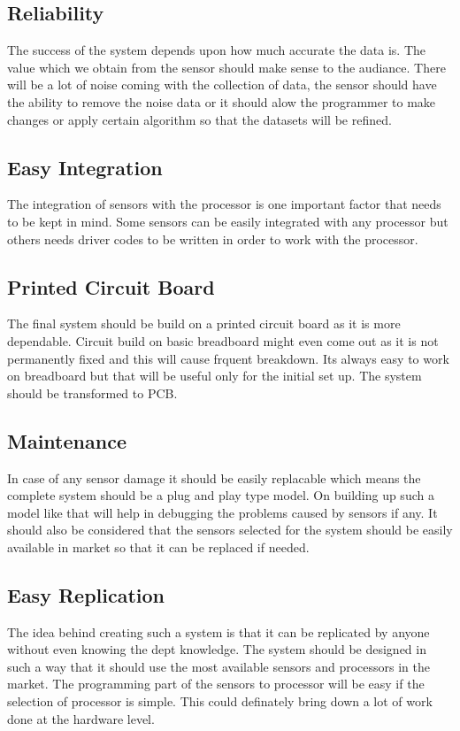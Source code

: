 \documentclass[11pt]{article}
\begin{document}
\subsection{Reliability}

The success of the system depends upon how much accurate the data is. The value which we obtain from the sensor should make sense to the audiance. There will be a lot of noise coming with the  collection of data, the sensor should have the ability to remove the noise data or it should alow the programmer to make changes or apply certain algorithm so that the datasets will be refined.


\subsection{Easy Integration}

The integration of sensors with the processor is one important factor that needs to be kept in mind. Some sensors can be easily integrated with any processor but others needs driver codes to be written in order to work with the processor.

\subsection{Printed Circuit Board}

The final system should be build on a printed circuit board as it is more dependable. Circuit build on basic breadboard might even come out as it is not permanently fixed and this will cause frquent breakdown. Its always easy to work on breadboard but that will be useful only for the initial set up. The system should be transformed to PCB.


\subsection{Maintenance}

In case of any sensor damage it should be easily replacable which means the complete system should be a plug and play type model. On building up such a  model like that will help in debugging the problems caused by sensors if any. It should also be considered that the sensors selected for the system should be easily available in market so that it can be replaced if needed.

\subsection{Easy Replication}
The idea behind creating such a system is that it can be replicated by anyone without even knowing the dept knowledge. The system should be designed in such a way that it should use the most available sensors and processors in the market. The programming part of the sensors to processor will be easy if the selection of processor is simple. This could definately bring down a lot of work done at the hardware level.
\end{document}
